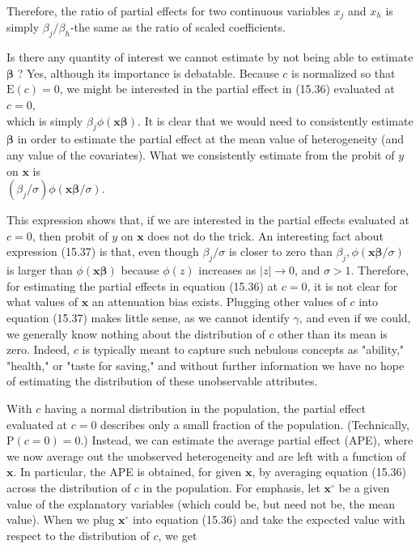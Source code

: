 \documentclass[10pt]{article}
\begin{document}
Therefore, the ratio of partial effects for two continuous variables $x_{j}$ and $x_{h}$ is simply $\beta_{j} / \beta_{h}$-the same as the ratio of scaled coefficients.

Is there any quantity of interest we cannot estimate by not being able to estimate $\boldsymbol{\beta}$ ? Yes, although its importance is debatable. Because $c$ is normalized so that $\mathrm{E}(c)=0$, we might be interested in the partial effect in (15.36) evaluated at $c=0$,\\
which is simply $\beta_{j} \phi(\mathbf{x} \boldsymbol{\beta})$. It is clear that we would need to consistently estimate $\boldsymbol{\beta}$ in order to estimate the partial effect at the mean value of heterogeneity (and any value of the covariates). What we consistently estimate from the probit of $y$ on $\mathbf{x}$ is\\
$\left(\beta_{j} / \sigma\right) \phi(\mathbf{x} \boldsymbol{\beta} / \sigma)$.

This expression shows that, if we are interested in the partial effects evaluated at $c=0$, then probit of $y$ on $\mathbf{x}$ does not do the trick. An interesting fact about expression (15.37) is that, even though $\beta_{j} / \sigma$ is closer to zero than $\beta_{j}, \phi(\mathbf{x} \boldsymbol{\beta} / \sigma)$ is larger than $\phi(\mathbf{x} \boldsymbol{\beta})$ because $\phi(z)$ increases as $|z| \rightarrow 0$, and $\sigma>1$. Therefore, for estimating the partial effects in equation (15.36) at $c=0$, it is not clear for what values of $\mathbf{x}$ an attenuation bias exists. Plugging other values of $c$ into equation (15.37) makes little sense, as we cannot identify $\gamma$, and even if we could, we generally know nothing about the distribution of $c$ other than its mean is zero. Indeed, $c$ is typically meant to capture such nebulous concepts as "ability," "health," or "taste for saving," and without further information we have no hope of estimating the distribution of these unobservable attributes.

With $c$ having a normal distribution in the population, the partial effect evaluated at $c=0$ describes only a small fraction of the population. (Technically, $\mathrm{P}(c=0)=0$.) Instead, we can estimate the average partial effect (APE), where we now average out the unobserved heterogeneity and are left with a function of $\mathbf{x}$. In particular, the APE is obtained, for given $\mathbf{x}$, by averaging equation (15.36) across the distribution of $c$ in the population. For emphasis, let $\mathbf{x}^{\circ}$ be a given value of the explanatory variables (which could be, but need not be, the mean value). When we plug $\mathbf{x}^{\circ}$ into equation (15.36) and take the expected value with respect to the distribution of $c$, we get
\end{document}
